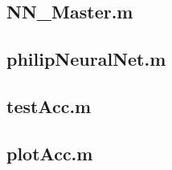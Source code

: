 \documentclass[12pt]{article}
\begin{document}
	\subsection*{NN\_Master.m}
	
	\subsection*{philipNeuralNet.m}
	
	
	\subsection*{testAcc.m}
	
	
	\subsection*{plotAcc.m}
	
	
	
	
		
	
\end{document}
